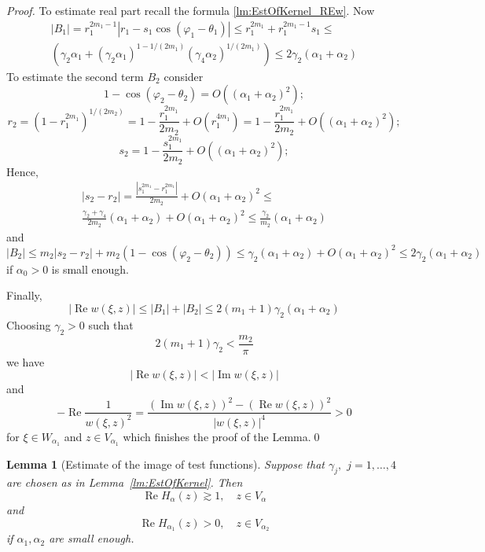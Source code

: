 \documentclass[review]{elsarticle}
\newtheorem{lem}[thm]{Lemma}
\newcommand{\abs}[1]{\left\vert #1 \right\vert}
\newcommand{\RE}{ \mathop{\mathrm{Re}} }
\newcommand{\IM}{ \mathop{\mathrm{Im}}  }
\begin{document}
\begin{proof}
	To estimate real part recall the formula \eqref{lm:EstOfKernel_REw}. Now
	\begin{multline*}
	\abs{B_1}=r_1^{2m_1-1}\abs{ r_1-s_1\cos(\varphi_1-\theta_1) } \leq r_1^{2m_1} + r_1^{2m_1-1} s_1 \leq \\	\left( \gamma_2\alpha_1+(\gamma_2\alpha_1)^{ 1-1/(2m_1) }(\gamma_{4}\alpha_2)^{ 1/(2m_1) }\right)\leq 2\gamma_2(\alpha_1+\alpha_2)
	\end{multline*}
	To estimate the second term $B_2$ consider
	$$ 
	1-\cos(\varphi_2-\theta_2) = O((\alpha_1+\alpha_2)^2);
	$$
	$$
	r_2=\left(1-r_1^{2m_1}\right)^{1/(2m_2)} = 1-\frac{r_1^{2m_1}}{2m_2} + O(r_1^{4m_1}) = 1-\frac{r_1^{2m_1}}{2m_2} + O((\alpha_1+\alpha_2)^2);
	$$
	$$
	s_2 = 1-\frac{s_1^{2m_1}}{2m_2} + O((\alpha_1+\alpha_2)^2);
	$$
	Hence,
	\begin{multline*}
		\abs{s_2-r_2} =  \frac{ \abs{s_1^{2m_1}-r_1^{2m_1}} }{  2m_2 } + O(\alpha_1+\alpha_2)^2 \leq \\
		\frac{\gamma_2 + \gamma_4}{2m_2}(\alpha_1+\alpha_2)+O(\alpha_1+\alpha_2)^2\leq \frac{\gamma_2}{m_2} (\alpha_1+\alpha_2)
	\end{multline*}
	and
	$$\abs{B_2}\leq m_2\abs{s_2-r_2}+m_2(1-\cos(\varphi_2-\theta_2))\leq 
	\gamma_2 (\alpha_1+\alpha_2) +O(\alpha_1+\alpha_2)^2\leq 2 \gamma_2 (\alpha_1+\alpha_2)
	$$
	if $\alpha_0>0$ is small enough. 	
	
	Finally,
 	$$
		\abs{\RE w(\xi,z) }\leq \abs{B_1}+\abs{B_2} \leq 2\left(m_1+1\right)\gamma_{2}(\alpha_1+\alpha_2)
	$$
	Choosing $\gamma_{2}>0$ such that
	$$ 2\left(m_1+1\right)\gamma_{2} < \frac{m_2}{\pi}$$
	we have 
	$$\abs{\RE w(\xi,z)} < \abs{\IM w(\xi,z)}$$
	and
	$$-\RE \frac{1}{w(\xi,z)^2} = \frac{(\IM{w(\xi,z)})^2-(\RE{w(\xi,z)})^2}{\abs{w(\xi,z)}^4} >0$$
	for $\xi\in W_{\alpha_1}$ and $z\in V_{\alpha_1}$ 
	which finishes the proof of the Lemma.\qed	
\end{proof}

\begin{lem}[Estimate of the image of test functions]
	Suppose that $\gamma_j,$ $j=1,\ldots,4$ are chosen as in Lemma~\ref{lm:EstOfKernel}. Then
	$$\RE{H_\alpha}(z) \gtrsim 1,\quad z\in V_\alpha$$ 
	and 
	$$ 
	\RE{H_{\alpha_1}(z)} > 0,\quad z\in V_{\alpha_2}
	$$
	if $\alpha_1,\alpha_2$ are small enough. 
\end{lem}
\end{document}
